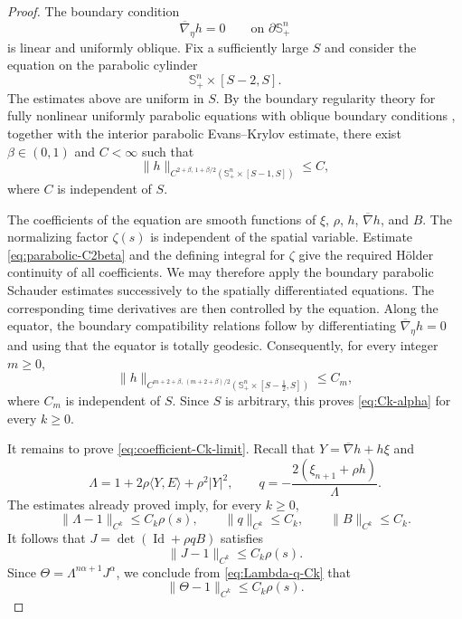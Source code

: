 \documentclass[11pt, reqno]{amsart}
\theoremstyle{remark}
\theoremstyle{definition}
\numberwithin{equation}{section}
\newcommand{\Id}{\operatorname{Id}}
\begin{document}
\begin{proof}
The boundary condition
\begin{equation*}
    \overline{\nabla}_\eta h=0
    \qquad\text{on }\partial\mathbb S^n_+
\end{equation*}
is linear and uniformly oblique. Fix a sufficiently large
$S$ and consider the equation on the parabolic cylinder
\begin{equation*}
    \mathbb S^n_+\times[S-2,S].
\end{equation*}
The estimates above are uniform in $S$. By the boundary regularity theory for fully nonlinear uniformly parabolic equations with oblique boundary conditions 
\cite[Theorem~5.6]{ChatzigeorgiouMilakis},
together with the interior parabolic Evans--Krylov estimate, there
exist $\beta\in(0,1)$ and $C<\infty$ such that
\begin{equation}\label{eq:parabolic-C2beta}
    \|h\|_
    {C^{2+\beta,\,1+\beta/2}
    (\mathbb S^n_+\times[S-1,S])}
    \leq C,
\end{equation}
where $C$ is independent of $S$.

The coefficients of the equation are smooth functions of
$\xi$, $\rho$, $h$, $\overline{\nabla}h$, and $B$. The
normalizing factor $\zeta(s)$ is independent of the spatial
variable. Estimate \eqref{eq:parabolic-C2beta} and
the defining integral for $\zeta$ give the required H\"older
continuity of all coefficients. We may therefore apply the
boundary parabolic Schauder estimates successively to the
spatially differentiated equations. The corresponding time
derivatives are then controlled by the equation. Along the
equator, the boundary compatibility relations follow by
differentiating $\overline{\nabla}_\eta h=0$ and using that the equator is
totally geodesic. Consequently, for every integer $m\geq0$,
\begin{equation*}
    \|h\|_
    {C^{m+2+\beta,\,(m+2+\beta)/2}
    (\mathbb S^n_+\times[S-\frac12,S])}    \leq C_m,
\end{equation*}
where $C_m$ is independent of $S$.  Since $S$ is arbitrary, this proves
\eqref{eq:Ck-alpha} for every $k\geq0$.

It remains to prove \eqref{eq:coefficient-Ck-limit}. Recall that $Y=\overline{\nabla}h+h\xi$ 
and
\begin{equation*}
    \Lambda
    =
    1+2\rho\langle Y,E\rangle+\rho^2|Y|^2,
    \qquad
    q
    =
    -\frac{2(\xi_{n+1}+\rho h)}{\Lambda}.
\end{equation*}
The estimates already proved imply, for every $k\geq0$,
\begin{equation}\label{eq:Lambda-q-Ck}
    \|\Lambda-1\|_{C^k}
    \leq C_k\rho(s),
    \qquad
    \|q\|_{C^k}\leq C_k,
    \qquad
    \|B\|_{C^k}\leq C_k.
\end{equation}
It follows that $J=\det(\Id+\rho qB)$ 
satisfies
\begin{equation*}
    \|J-1\|_{C^k}\leq C_k\rho(s).
\end{equation*}
Since $\Theta=\Lambda^{n\alpha+1}J^\alpha$,  
we conclude from \eqref{eq:Lambda-q-Ck} that
\begin{equation}\label{eq:Theta-Ck}
    \|\Theta-1\|_{C^k}\leq C_k\rho(s).
\end{equation}


\end{proof}
\end{document}
